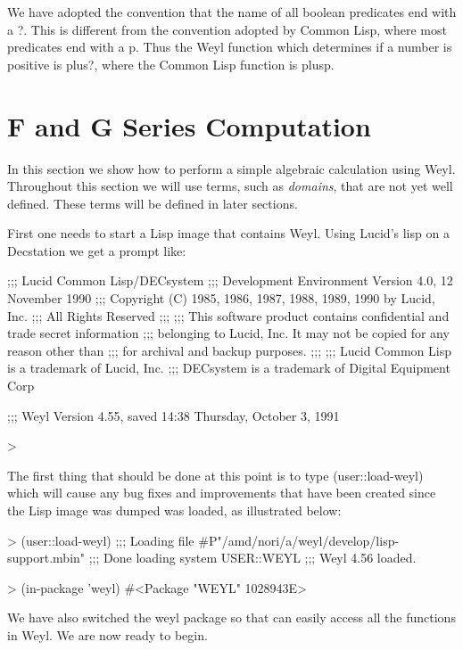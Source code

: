 We have adopted the convention that the name of all boolean predicates
end with a {\sf ?}.  This is different from the convention adopted by
Common Lisp, where most predicates end with a {\sf p}.  Thus the Weyl
function which determines if a number is positive is {\sf plus?}, where
the Common Lisp function is {\sf plusp}.  

\section{F and G Series Computation}
\label{FandG:Sec}

In this section we show how to perform a simple algebraic calculation
using Weyl.  Throughout this section we will use terms, such as {\em
domains\/}, that are not yet well defined.  These terms will be defined
in later sections.

First one needs to start a Lisp image that contains Weyl.  Using
Lucid's lisp on a Decstation we get a prompt like:
\noindent
\begin{code}
;;; Lucid Common Lisp/DECsystem
;;; Development Environment Version 4.0, 12 November 1990
;;; Copyright (C) 1985, 1986, 1987, 1988, 1989, 1990 by Lucid, Inc.
;;; All Rights Reserved
;;;
;;; This software product contains confidential and trade secret information
;;; belonging to Lucid, Inc.  It may not be copied for any reason other than
;;; for archival and backup purposes.
;;;
;;; Lucid Common Lisp is a trademark of Lucid, Inc.
;;; DECsystem is a trademark of Digital Equipment Corp

;;; Weyl Version 4.55, saved 14:38 Thursday, October 3, 1991

> 
\end{code}

The first thing that should be done at this point is to type {\sf
(user::load-weyl)} which will cause any bug fixes and improvements
that have been created since the Lisp image was dumped was loaded, as
illustrated below:
\begin{code}
> (user::load-weyl)
;;; Loading file #P"/amd/nori/a/weyl/develop/lisp-support.mbin"
;;; Done loading system USER::WEYL
;;; Weyl 4.56 loaded. 

> (in-package 'weyl)
#<Package "WEYL" 1028943E>
\end{code}
We have also switched the {\sf weyl} package so that can easily access
all the functions in Weyl.  We are now ready to begin.


